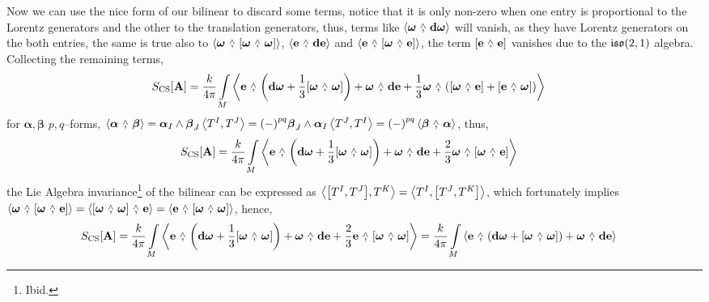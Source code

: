 Now we can use the nice form of our bilinear to discard some terms, notice that it is only non-zero when one entry 
is proportional to the Lorentz generators and the other to the translation generators, thus, terms like $\expval{\boldsymbol\omega\ \wedgecomma\ \vb d\boldsymbol\omega}$ will vanish, as they have Lorentz 
generators on the both entries, the same is true also to $\expval{\boldsymbol\omega\ \wedgecomma\ \wedgecomm{\boldsymbol\omega}{\boldsymbol\omega}}$, $\expval{\vb e\ \wedgecomma\ \vb d\vb e}$ and $\expval{\vb e\ \wedgecomma\ \wedgecomm{\boldsymbol\omega}{\vb e}}$, the term $\wedgecomm{\vb e}{\vb e}$ vanishes due to the $\mathfrak{iso}\qty(2,1)$ algebra. 
Collecting the remaining terms,
\begin{align*}
    S_{\textnormal{CS}}\qty[\vb A]&=\frac{k}{4\pi}\int\limits_M\expval{\vb e\ \wedgecomma\ \qty( \vb d{\boldsymbol\omega}+\frac13 \wedgecomm{\boldsymbol\omega}{\boldsymbol\omega})+\boldsymbol\omega\ \wedgecomma\ \vb d{\vb e}+\frac13\boldsymbol\omega\ \wedgecomma\ \qty(\wedgecomm{\boldsymbol\omega}{\vb e}+\wedgecomm{\vb e}{\boldsymbol\omega})}
\end{align*}
for $\boldsymbol\alpha,\boldsymbol\beta$ $p,q$--forms, $\expval{\boldsymbol\alpha\ \wedgecomma\ \boldsymbol\beta}=\boldsymbol\alpha_I\wedge\boldsymbol\beta_J\expval{T^I,T^J}=\qty(-)^{pq}\boldsymbol\beta_J\wedge\boldsymbol\alpha_I\expval{T^J,T^I}=\qty(-)^{pq}\expval{\boldsymbol\beta\ \wedgecomma\ \boldsymbol\alpha}$, thus,
\begin{align*}
    S_{\textnormal{CS}}\qty[\vb A]&=\frac{k}{4\pi}\int\limits_M\expval{\vb e\ \wedgecomma\ \qty( \vb d{\boldsymbol\omega}+\frac13 \wedgecomm{\boldsymbol\omega}{\boldsymbol\omega})+\boldsymbol\omega\ \wedgecomma\ \vb d{\vb e}+\frac23\boldsymbol\omega\ \wedgecomma\ \wedgecomm{\boldsymbol\omega}{\vb e}}
\end{align*}
the Lie Algebra invariance\footnote{Ibid.} of the bilinear can be expressed as $\expval{\comm{T^I}{T^J},{T^K}}=\expval{T^I,\comm{T^J}{T^K}}$, which fortunately implies $\expval{\boldsymbol\omega\ \wedgecomma\ \wedgecomm{\boldsymbol\omega}{\vb e}}=\expval{\wedgecomm{\boldsymbol\omega}{\boldsymbol\omega}\ \wedgecomma\ \vb e}=\expval{\vb e\ \wedgecomma\ \wedgecomm{\boldsymbol\omega}{\boldsymbol\omega}}$, 
hence,
\begin{align*}
    S_{\textnormal{CS}}\qty[\vb A]&=\frac{k}{4\pi}\int\limits_M\expval{\vb e\ \wedgecomma\ \qty( \vb d{\boldsymbol\omega}+\frac13 \wedgecomm{\boldsymbol\omega}{\boldsymbol\omega})+\boldsymbol\omega\ \wedgecomma\ \vb d{\vb e}+\frac23\vb e\ \wedgecomma\ \wedgecomm{\boldsymbol\omega}{\boldsymbol\omega}}=\frac{k}{4\pi}\int\limits_M\expval{\vb e\ \wedgecomma\ \qty( \vb d{\boldsymbol\omega}+ \wedgecomm{\boldsymbol\omega}{\boldsymbol\omega})+\boldsymbol\omega\ \wedgecomma\ \vb d{\vb e}}
\end{align*}
